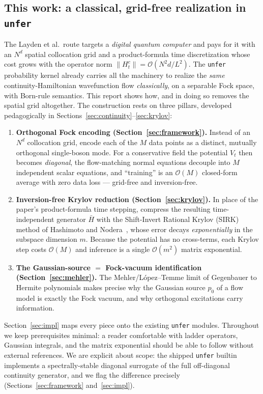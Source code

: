 \documentclass[11pt, a4paper]{article}
\begin{document}
\subsection{This work: a classical, grid-free realization in \texttt{unfer}}

The Layden et al.\ route targets a \emph{digital quantum computer} and pays for
it with an $N^d$ spatial collocation grid and a product-formula time
discretization whose cost grows with the operator norm $\|H_t^c\|=
\mathcal{O}(N^2 d/L^2)$. The \texttt{unfer} probability kernel already carries
all the machinery to realize the \emph{same} continuity-Hamiltonian
wavefunction flow \emph{classically}, on a separable Fock space, with Born-rule
semantics. This report shows how, and in doing so removes the spatial grid
altogether. The construction rests on three pillars, developed pedagogically
in Sections~\ref{sec:continuity}--\ref{sec:krylov}:

\begin{enumerate}
\item \textbf{Orthogonal Fock encoding (Section~\ref{sec:framework}).} Instead
of an $N^d$ collocation grid, encode each of the $M$ data points as a distinct,
mutually orthogonal single-boson mode. For a conservative field the potential
$V_t$ then becomes \emph{diagonal}, the flow-matching normal equations decouple
into $M$ independent scalar equations, and ``training'' is an $\mathcal{O}(M)$
closed-form average with zero data loss --- grid-free and inversion-free.

\item \textbf{Inversion-free Krylov reduction (Section~\ref{sec:krylov}).} In
place of the paper's product-formula time stepping, compress the resulting
time-independent generator $\bar H$ with the Shift-Invert Rational Krylov
(SIRK) method of Hashimoto and Nodera~\cite{Hashimoto2019}, whose error decays
\emph{exponentially} in the subspace dimension $m$. Because the potential has
no cross-terms, each Krylov step costs $\mathcal{O}(M)$ and inference is a
single $\mathcal{O}(m^2)$ matrix exponential.

\item \textbf{The Gaussian-source $=$ Fock-vacuum identification
(Section~\ref{sec:mehler}).} The Mehler/L\'opez--Temme limit of Gegenbauer to
Hermite polynomials makes precise why the Gaussian source $p_0$ of a flow model
is exactly the Fock vacuum, and why orthogonal excitations carry information.
\end{enumerate}

Section~\ref{sec:impl} maps every piece onto the existing \texttt{unfer}
modules. Throughout we keep prerequisites minimal: a reader comfortable with
ladder operators, Gaussian integrals, and the matrix exponential should be able
to follow without external references. We are explicit about scope: the shipped
\texttt{unfer} builtin implements a spectrally-stable diagonal surrogate of the
full off-diagonal continuity generator, and we flag the difference precisely
(Sections~\ref{sec:framework} and~\ref{sec:impl}).
\end{document}
